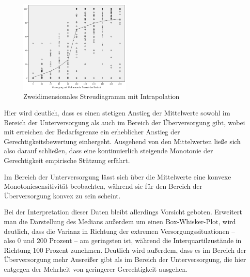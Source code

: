 \documentclass[a4paper]{thesis}
\begin{document}
\begin{figure}[H]
\centering
\includegraphics[width=0.5\textwidth]{figures/streu_2d_intra.png}
\caption[Zweidimensionales Streudiagramm mit Intrapolation]{Zweidimensionales Streudiagramm mit Intrapolation}
\end{figure}

Hier wird deutlich, dass es einen stetigen Anstieg der Mittelwerte sowohl im Bereich der Unterversorgung als auch im Bereich der Überversorgung gibt, wobei mit erreichen der Bedarfsgrenze ein erheblicher Anstieg der Gerechtigkeitsbewertung einhergeht. Ausgehend von den Mittelwerten ließe sich also darauf schließen, dass eine kontinuierlich steigende Monotonie der Gerechtigkeit empirische Stützung erfährt.

Im Bereich der Unterversorgung lässt sich über die Mittelwerte eine konvexe Monotoniesensitivität beobachten, während sie für den Bereich der Überversorgung konvex zu sein scheint.

Bei der Interpretation dieser Daten bleibt allerdings Vorsicht geboten. Erweitert man die Darstellung des Medians außerdem um einen Box-Whisker-Plot, wird deutlich, dass die Varianz in Richtung der extremen Versorgungssituationen -- also 0 und 200 Prozent -- am geringsten ist, während die Interquartilzustände in Richtung 100 Prozent zunehmen. Deutlich wird außerdem, dass es im Bereich der Überversorgung mehr Ausreißer gibt als im Bereich der Unterversorgung, die hier entgegen der Mehrheit von geringerer Gerechtigkeit ausgehen.
\end{document}
